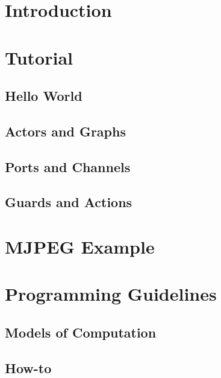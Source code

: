 \section{Introduction}

\section{Tutorial}
\subsection{Hello World}

\subsection{Actors and Graphs}

\subsection{Ports and Channels}

\subsection{Guards and Actions}



\section{MJPEG Example}
\section{Programming Guidelines}
\subsection{Models of Computation}

\subsection{How-to}




